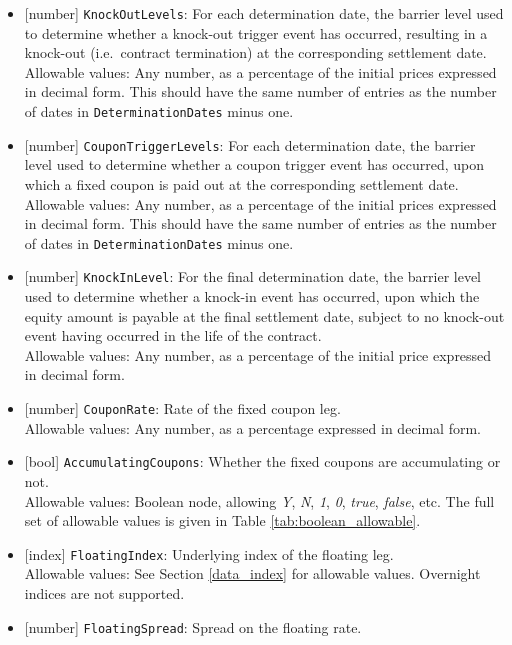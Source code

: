 \begin{itemize}
  \item{}[number] \lstinline!KnockOutLevels!: For each determination date, the barrier level used to determine whether a knock-out
  trigger event has occurred, resulting in a knock-out (i.e.\ contract termination) at the corresponding settlement date. \\
  Allowable values: Any number, as a percentage of the initial prices expressed in decimal form. This should have the same number
  of entries as the number of dates in \lstinline!DeterminationDates! minus one.
  \item{}[number] \lstinline!CouponTriggerLevels!: For each determination date, the barrier level used to determine whether a coupon
  trigger event has occurred, upon which a fixed coupon is paid out at the corresponding settlement date. \\
  Allowable values: Any number, as a percentage of the initial prices expressed in decimal form. This should have the same number
  of entries as the number of dates in \lstinline!DeterminationDates! minus one.
  \item{}[number] \lstinline!KnockInLevel!: For the final determination date, the barrier level used to determine whether
  a knock-in event has occurred, upon which the equity amount is payable at the final settlement date, subject to no
  knock-out event having occurred in the life of the contract. \\
  Allowable values: Any number, as a percentage of the initial price expressed in decimal form.
  \item{}[number] \lstinline!CouponRate!: Rate of the fixed coupon leg. \\
  Allowable values: Any number, as a percentage expressed in decimal form.
  \item{}[bool] \lstinline!AccumulatingCoupons!: Whether the fixed coupons are accumulating or not. \\
  Allowable values: Boolean node, allowing \emph{Y}, \emph{N}, \emph{1}, \emph{0}, \emph{true}, \emph{false}, etc. The
  full set of allowable values is given in Table \ref{tab:boolean_allowable}.
  \item{}[index] \lstinline!FloatingIndex!: Underlying index of the floating leg. \\
  Allowable values: See Section \ref{data_index} for allowable values. Overnight indices are not supported.
  \item{}[number] \lstinline!FloatingSpread!: Spread on the floating rate. \\

\end{itemize}

